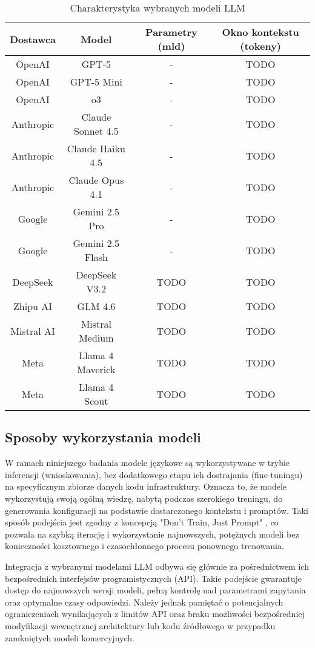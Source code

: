 \begin{table}[!h] \centering
\caption{Charakterystyka wybranych modeli LLM}
\label{tab:llm-characteristic}
\begin{tabular}{| c | c | c | c |} \hline
\textbf{Dostawca} & \textbf{Model} & \textbf{Parametry (mld)} & \textbf{Okno kontekstu (tokeny)} \\ \hline\hline
OpenAI & GPT-5 & - & TODO \\ \hline
OpenAI & GPT-5 Mini & - & TODO \\ \hline
OpenAI & o3 & - & TODO \\ \hline
Anthropic & Claude Sonnet 4.5 & - & TODO \\ \hline
Anthropic & Claude Haiku 4.5 & - & TODO \\ \hline
Anthropic & Claude Opus 4.1 & - & TODO \\ \hline
Google & Gemini 2.5 Pro & - & TODO \\ \hline
Google & Gemini 2.5 Flash & - & TODO \\ \hline
DeepSeek & DeepSeek V3.2 & TODO & TODO \\ \hline
Zhipu AI & GLM 4.6 & TODO & TODO \\ \hline
Mistral AI & Mistral Medium & TODO & TODO \\ \hline
Meta & Llama 4 Maverick & TODO & TODO \\ \hline
Meta & Llama 4 Scout & TODO & TODO \\ \hline
\end{tabular}
\end{table}

\subsection{Sposoby wykorzystania modeli}

W ramach niniejszego badania modele językowe są wykorzystywane w trybie inferencji (wnioskowania), bez dodatkowego etapu ich dostrajania (fine-tuningu) na specyficznym zbiorze danych kodu infrastruktury. Oznacza to, że modele wykorzystują swoją ogólną wiedzę, nabytą podczas szerokiego treningu, do generowania konfiguracji na podstawie dostarczonego kontekstu i promptów. Taki sposób podejścia jest zgodny z koncepcją "Don't Train, Just Prompt" \cite{kratzke_dont_2024}, co pozwala na szybką iterację i wykorzystanie najnowszych, potężnych modeli bez konieczności kosztownego i czasochłonnego procesu ponownego trenowania.

Integracja z wybranymi modelami LLM odbywa się głównie za pośrednictwem ich bezpośrednich interfejsów programistycznych (API). Takie podejście gwarantuje dostęp do najnowszych wersji modeli, pełną kontrolę nad parametrami zapytania oraz optymalne czasy odpowiedzi. Należy jednak pamiętać o potencjalnych ograniczeniach wynikających z limitów API oraz braku możliwości bezpośredniej modyfikacji wewnętrznej architektury lub kodu źródłowego w przypadku zamkniętych modeli komercyjnych.

